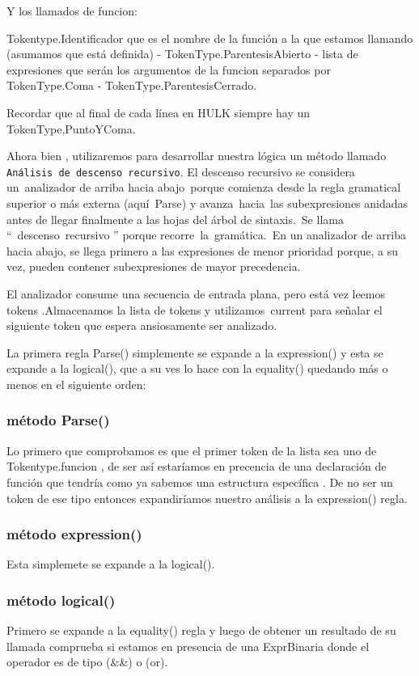 \documentclass[a4paper,12pt]{article}
\begin{document}
Y los llamados de funcion:

Tokentype.Identificador que es el nombre de la función a la que estamos llamando (asumamos que está definida) - TokenType.ParentesisAbierto - lista de expresiones que serán los argumentos de la funcion separados por TokenType.Coma - TokenType.ParentesisCerrado.

Recordar que al final de cada línea en HULK siempre hay un TokenType,PuntoYComa.

Ahora bien , utilizaremos para desarrollar nuestra lógica un método llamado \texttt{Análisis de descenso recursivo}.
El descenso recursivo se considera un analizador de arriba hacia abajo porque comienza desde la regla gramatical 
superior o más externa (aquí Parse) y avanza hacia las subexpresiones anidadas antes de llegar finalmente a las hojas 
del árbol de sintaxis. Se llama “ descenso recursivo ” porque recorre la gramática. En un analizador de arriba hacia 
abajo, se llega primero a las expresiones de menor prioridad porque, a su vez, pueden contener subexpresiones de mayor precedencia.

El analizador consume una secuencia de entrada plana, pero está vez leemos tokens .Almacenamos la lista de tokens y 
utilizamos current para señalar el siguiente token que espera ansiosamente ser analizado.

La primera regla  Parse() simplemente se expande a la expression()
y esta se expande a la logical(), que a su ves lo hace con la equality() quedando más o menos en el siguiente orden:

\subsubsection[short]{ método Parse()}

Lo primero que comprobamos es que el primer token de la lista sea uno de Tokentype.funcion , de ser así estaríamos en precencia de una declaración de función que tendría como ya sabemos una estructura específica 
. De no ser un token de ese tipo entonces expandiríamos nuestro análisis a la expression() regla.


\subsubsection[short]{ método expression()}
Esta simplemete se expande a la logical().
\subsubsection[short]{ método logical()}
 Primero se expande a la equality() regla y luego de obtener un resultado de su llamada comprueba si estamos en presencia de una ExprBinaria donde el operador es de tipo (\&\&) o (or).
\end{document}
